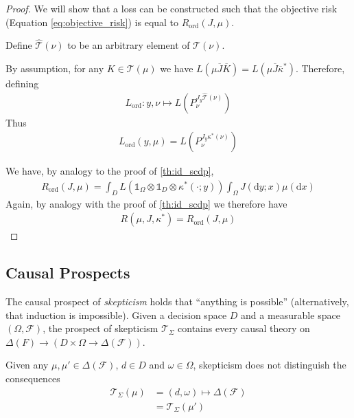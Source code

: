 \begin{proof}
We will show that a loss can be constructed such that the objective risk (Equation \ref{eq:objective_risk}) is equal to $R_{\text{ord}}(J,\mu)$.

Define $\hat{\mathscr{T}}(\nu)$ to be an arbitrary element of $\mathscr{T}(\nu)$.

By assumption, for any $K\in \mathscr{T}(\mu)$ we have $L(\mu \overline{J} \overline{K}) = L(\mu \overline{J} \overline{\kappa}^*)$. Therefore, defining
\begin{align}
    L_{\text{ord}}:y,\nu\mapsto L(P_\nu^{J_y \hat{\mathscr{T}}(\nu)})
\end{align}
Thus
\begin{align}
    L_{\text{ord}}(y,\mu) = L(P_\nu^{J_y \kappa^*(\nu)})
\end{align}

We have, by analogy to the proof of \ref{th:id_scdp},
\begin{align}
    R_{\text{ord}}(J,\mu) = \int_D L(\mathds{1}_{\Omega}\otimes \mathds{1}_D\otimes \kappa^*(\cdot;y)) \int_\Omega J(\mathrm{d}y;x) \mu(\mathrm{d}x)
\end{align}
Again, by analogy with the proof of \ref{th:id_scdp} we therefore have
\begin{align}
    R(\mu,J,\kappa^*) = R_{\text{ord}}(J,\mu)
\end{align}
\end{proof}



\subsection{Causal Prospects}


\begin{example}[Skepticism]
The causal prospect of \emph{skepticism} holds that ``anything is possible'' (alternatively, that induction is impossible). Given a decision space $D$ and a measurable space $(\Omega,\mathcal{F})$, the prospect of skepticism $\mathscr{T}_\Sigma$ contains every causal theory on $\Delta(F)\to(D\times \Omega\to \Delta(\mathcal{F}))$. 

Given any $\mu,\mu'\in \Delta(\mathcal{F})$, $d\in D$ and $\omega\in \Omega$, skepticism does not distinguish the consequences
\begin{align}
    \mathscr{T}_\Sigma(\mu) &= (d,\omega)\mapsto \Delta(\mathcal{F})\\
                            &= \mathscr{T}_\Sigma(\mu')
\end{align}
\end{example}

